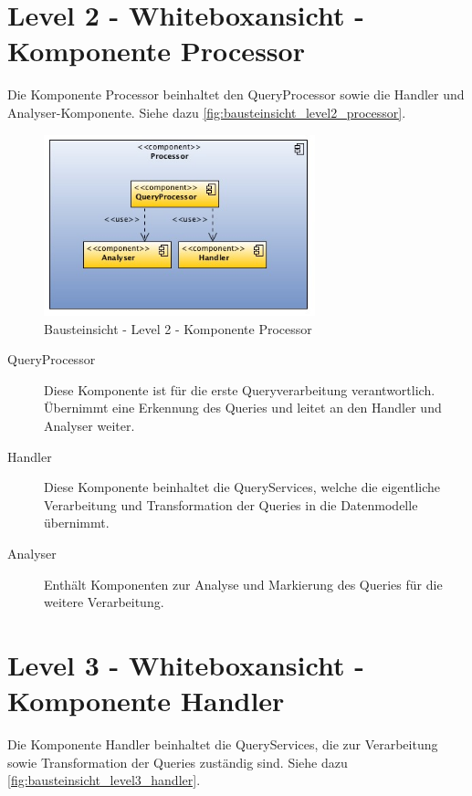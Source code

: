 \section{Level 2 - Whiteboxansicht - Komponente Processor}

Die Komponente Processor beinhaltet den QueryProcessor sowie die Handler und Analyser-Komponente. Siehe dazu \autoref{fig:bausteinsicht_level2_processor}. 

\begin{figure}[htbp]
	\centering
		\includegraphics[width=0.70\textwidth]{images/bausteinsicht_plib_level2_processor.jpg}
	\caption{Bausteinsicht - Level 2 - Komponente Processor}
	\label{fig:bausteinsicht_level2_processor}
\end{figure}

\begin{description}
\item[QueryProcessor] Diese Komponente ist für die erste Queryverarbeitung verantwortlich. Übernimmt eine Erkennung des Queries und leitet an den Handler und Analyser weiter. 
\item[Handler] Diese Komponente beinhaltet die QueryServices, welche die eigentliche Verarbeitung und Transformation der Queries in die Datenmodelle übernimmt.
\item[Analyser] Enthält Komponenten zur Analyse und Markierung des Queries für die weitere Verarbeitung. 
\end{description}

\section{Level 3 - Whiteboxansicht - Komponente Handler}

Die Komponente Handler beinhaltet die QueryServices, die zur Verarbeitung sowie Transformation der Queries zuständig sind. Siehe dazu \autoref{fig:bausteinsicht_level3_handler}. 

